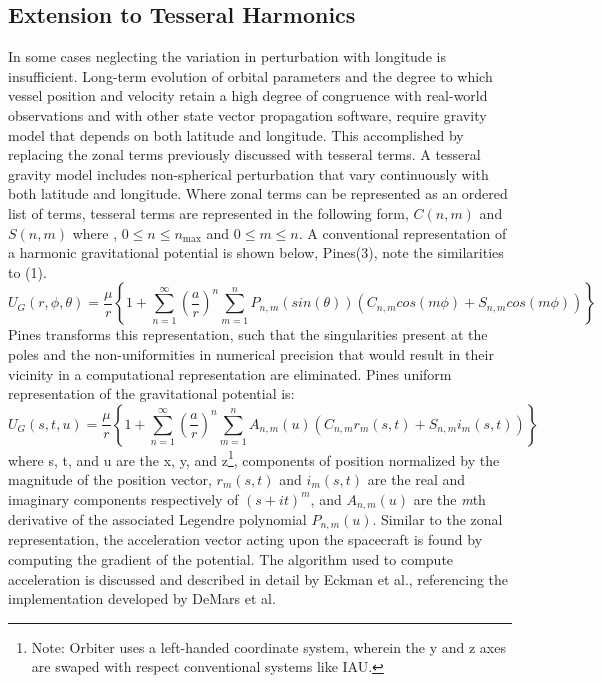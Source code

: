 \documentclass[Orbiter Technical Reference.tex]{subfiles}
\begin{document}
\subsection{Extension to Tesseral Harmonics}
In some cases neglecting the variation in perturbation with longitude is insufficient. Long-term evolution of orbital parameters and the degree to which vessel position and velocity retain a high degree of congruence with real-world observations and with other state vector propagation software, require gravity model that depends on both latitude and longitude.
This accomplished by replacing the zonal terms previously discussed with tesseral terms. A tesseral gravity model includes non-spherical perturbation that vary continuously with both latitude and longitude. Where zonal terms can be represented as an ordered list of terms, tesseral terms are represented in the following form, $C(n,m)$ and $S(n,m)$ where , $0 \leq n \leq n_\text{max}$ and $0 \leq m \leq n$.
A conventional representation of a harmonic gravitational potential is shown below, Pines\cite{pines73}(3), note the similarities to (1).
\begin{equation}
U_G(r,\phi,\theta) = \frac{\mu}{r}\left\{1+\sum_{n=1}^{\infty}\left ( \frac{a}{r} \right )^n \sum_{m=1}^{n}P_{n,m}(sin (\theta))(C_{n,m}cos(m\phi)+S_{n,m}cos(m\phi)) \right\}
\end{equation}
Pines\cite{pines73} transforms this representation, such that the singularities present at the poles and the non-uniformities in numerical precision that would result in their vicinity in a computational representation are eliminated. Pines\cite{pines73} uniform representation of the gravitational potential is:
\begin{equation}
U_G(s, t, u) = \frac{\mu}{r}\left\{1+\sum_{n=1}^{\infty}\left ( \frac{a}{r} \right )^n \sum_{m=1}^{n}A_{n,m}(u)(C_{n,m}r_m(s,t)+S_{n,m}i_m(s,t)) \right\}
\end{equation}
where s, t, and u are the x, y, and z\footnote{Note: Orbiter uses a left-handed coordinate system, wherein the y and z axes are swaped with respect conventional systems like IAU.}, components of position normalized by the magnitude of the position vector, $r_m(s,t)$ and $i_m(s,t)$  are the real and imaginary components respectively of $(s+it)^m$, and $A_{n,m}(u)$ are the \emph{m}th derivative of the associated Legendre polynomial $P_{n,m}(u)$.
Similar to the zonal representation, the acceleration vector acting upon the spacecraft is found by computing the gradient of the potential. The algorithm used to compute acceleration is discussed and described in detail by Eckman et al.\cite{Eckman08}, referencing the implementation developed by DeMars et al.\cite{DeMars08}
\end{document}

